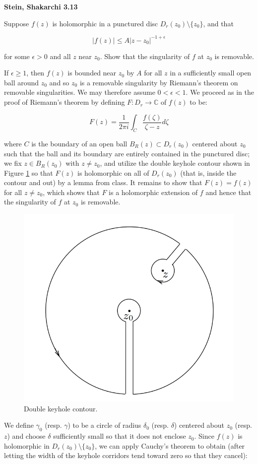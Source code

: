 \textbf{Stein, Shakarchi 3.13}

Suppose $f(z)$ is holomorphic in a punctured disc $D_r(z_0) \setminus \{z_0\}$, and that

$$
|f(z)| \le A|z - z_0|^{-1 + \epsilon}
$$

for some $\epsilon > 0$ and all $z$ near $z_0$. Show that the singularity of $f$ at $z_0$ is removable.

\begin{solution}
  If $\epsilon \ge 1$, then $f(z)$ is bounded near $z_0$ by $A$ for all $z$ in a sufficiently small open ball around 
  $z_0$ and so $z_0$ is a removable singularity by Riemann's theorem on removable singularities. We may therefore assume 
  $0 < \epsilon < 1$.  We proceed as in the proof of Riemann's theorem by defining $F: D_r \to \mathbb{C}$ of $f(z)$ to 
  be:

  $$
  F(z) = \frac{1}{2 \pi i} \int_C \frac{f(\zeta)}{\zeta - z} d\zeta
  $$

  where $C$ is the boundary of an open ball $B_R(z) \subset D_r(z_0)$ centered about $z_0$ such that the ball and its 
  boundary are entirely contained in the punctured disc; we fix $z \in B_R(z_0)$ with $z \neq z_0$, and utilize the 
  double keyhole contour shown in Figure \ref{fig:double_keyhole_contour} so that $F(z)$ is holomorphic on all of 
  $D_r(z_0)$ (that is, inside the contour and out) by a lemma from class. It remains to show that $F(z) = f(z)$ for all 
  $z \neq z_0$, which shows that $F$ is a holomorphic extension of $f$ and hence that the singularity of $f$ at $z_0$ is 
  removable. 

  \begin{figure}[h]
    \centering
    \includegraphics[width=0.4 \textwidth]{problem_7.png}
    \caption{Double keyhole contour.}
    \label{fig:double_keyhole_contour}
  \end{figure}

  We define $\gamma_0$ (resp. $\gamma$) to be a circle of radius $\delta_0$ (resp. $\delta$) centered about $z_0$ 
  (resp. $z$) and choose $\delta$ sufficiently small so that it does not enclose $z_0$. Since $f(z)$ is holomorphic in 
  $D_r(z_0) \setminus \{z_0\}$, we can apply Cauchy's theorem to obtain (after letting the width of the keyhole 
  corridors tend toward zero so that they cancel):


\end{solution}
